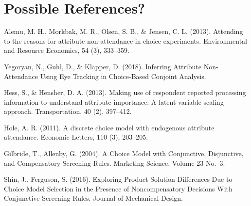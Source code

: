 \documentclass[12pt,titlepage]{mktg-article}
\begin{document}
\hypertarget{possible-references}{%
\section{Possible References?}\label{possible-references}}

Alemu, M. H., Morkbak, M. R., Olsen, S. B., \& Jensen, C. L. (2013). Attending to the reasons for attribute non-attendance in choice experiments. Environmental and Resource Economics, 54 (3), 333--359.

Yegoryan, N., Guhl, D., \& Klapper, D. (2018). Inferring Attribute Non-Attendance Using Eye Tracking in Choice-Based Conjoint Analysis.

Hess, S., \& Hensher, D. A. (2013). Making use of respondent reported processing information
to understand attribute importance: A latent variable scaling approach. Transportation, 40 (2), 397--412.

Hole, A. R. (2011). A discrete choice model with endogenous attribute attendance. Economic
Letters, 110 (3), 203--205.

Gilbride, T., Allenby, G. (2004). A Choice Model with Conjunctive, Disjunctive, and Compensatory Screening Rules. Marketing Science, Volume 23 No.~3.

Shin, J., Ferguson, S. (2016). Exploring Product Solution Differences Due to Choice Model Selection in the Presence of Noncompensatory Decisions With Conjunctive Screening Rules. Journal of Mechanical Design.

\pagebreak


\end{document}
